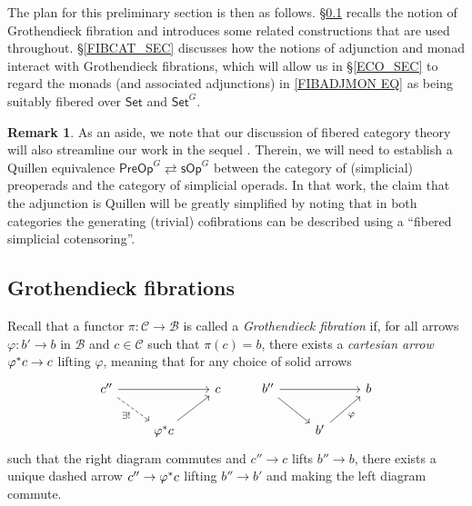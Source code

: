 \documentclass[a4paper,10pt
]{article}%
\numberwithin{equation}{section}
\numberwithin{figure}{section}
\theoremstyle{definition} %
\newtheorem{remark}[equation]{Remark}%
\newcommand{\1}{\ensuremath{\mathbbm 1}}%
\begin{document}
The plan for this preliminary section is then as follows.
%
\S \ref{GROTFIB SEC} recalls the notion of Grothendieck fibration and
introduces some related constructions that are used throughout.
%
\S \ref{FIBCAT_SEC} discusses how the notions of adjunction and monad interact with Grothendieck fibrations,
which will allow us in \S \ref{ECO_SEC}
to regard the monads
(and associated adjunctions)
in \eqref{FIBADJMON EQ}
as being suitably fibered over $\mathsf{Set}$ and $\mathsf{Set}^G$.
%


\begin{remark}
        As an aside,
        we note that our discussion of fibered category theory will
        also streamline our work in the sequel \cite{BP_TAS}.
        Therein, we will need to establish a Quillen equivalence
        $\mathsf{PreOp}^G \rightleftarrows \mathsf{sOp}^G$
        between the category of (simplicial) preoperads and
        the category of simplicial operads.
        In that work, the claim that the adjunction is Quillen 
        will be greatly simplified by noting that in both categories 
        the generating (trivial) cofibrations
        can be described using a ``fibered simplicial cotensoring''.
\end{remark}



\subsection{Grothendieck fibrations}\label{GROTFIB SEC}


Recall that a functor 
$\pi \colon \mathcal{C} \to \mathcal{B}$
is called a \emph{Grothendieck fibration} if,
for all arrows
$\varphi \colon b' \to b$ in $\mathcal{B}$
and $c \in \mathcal{C}$ such that $\pi(c) = b$,
there exists a \emph{cartesian arrow}
$\varphi^{\**}c \to c$
lifting $\varphi$,
meaning that for any choice of solid arrows
\begin{equation}\label{CARTARDEF EQ}
\begin{tikzcd}
c'' \ar{rr} \ar[dashed]{rd}[swap]{\exists!} 
&&
c
&%
b'' \ar{rr} \ar{rd} 
&&
b
\\
& \varphi^{\**} c \ar{ru}
&
&%
& b'\ar{ru}[swap]{\varphi}
&
\end{tikzcd}
\end{equation}
such that the right diagram commutes and 
$c'' \to c$ lifts $b'' \to b$,
there exists a unique dashed arrow
$c'' \to \varphi^{\**} c$ lifting $b'' \to b'$
and making the left diagram commute.
\end{document}
